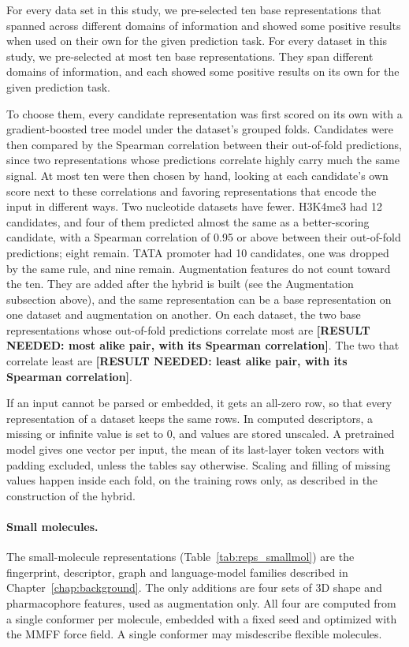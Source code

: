 For every data set in this study, we pre-selected ten base representations that spanned across different domains of information and showed some positive results when used on their own for the given prediction task.
For every dataset in this study, we pre-selected at most ten base representations. They span different domains of information, and each showed some positive results on its own for the given prediction task.

To choose them, every candidate representation was first scored on its own with a gradient-boosted tree model \citep{ke2017lightgbm} under the dataset's grouped folds. Candidates were then compared by the Spearman correlation between their out-of-fold predictions, since two representations whose predictions correlate highly carry much the same signal. At most ten were then chosen by hand, looking at each candidate's own score next to these correlations and favoring representations that encode the input in different ways. Two nucleotide datasets have fewer. H3K4me3 had 12 candidates, and four of them predicted almost the same as a better-scoring candidate, with a Spearman correlation of 0.95 or above between their out-of-fold predictions; eight remain. TATA promoter had 10 candidates, one was dropped by the same rule, and nine remain. Augmentation features do not count toward the ten. They are added after the hybrid is built (see the Augmentation subsection above), and the same representation can be a base representation on one dataset and augmentation on another.
On each dataset, the two base representations whose out-of-fold predictions correlate most are \textbf{[RESULT NEEDED: most alike pair, with its Spearman correlation]}. The two that correlate least are \textbf{[RESULT NEEDED: least alike pair, with its Spearman correlation]}.

If an input cannot be parsed or embedded, it gets an all-zero row, so that every representation of a dataset keeps the same rows. In computed descriptors, a missing or infinite value is set to 0, and values are stored unscaled. A pretrained model gives one vector per input, the mean of its last-layer token vectors with padding excluded, unless the tables say otherwise. Scaling and filling of missing values happen inside each fold, on the training rows only, as described in the construction of the hybrid.

\paragraph{Small molecules.} The small-molecule representations (Table~\ref{tab:reps_smallmol}) are the fingerprint, descriptor, graph and language-model families described in Chapter~\ref{chap:background}. The only additions are four sets of 3D shape and pharmacophore features, used as augmentation only. All four are computed from a single conformer per molecule, embedded with a fixed seed and optimized with the MMFF force field. A single conformer may misdescribe flexible molecules.

